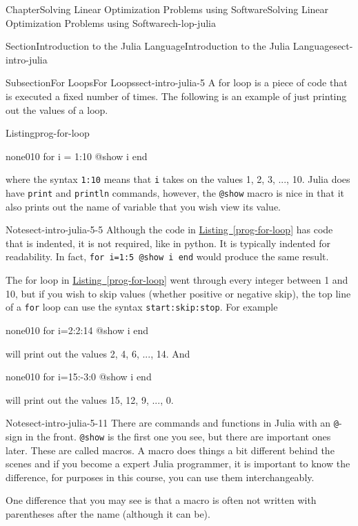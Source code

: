 \documentclass[oneside,10pt,]{book}
\newcommand{\xreffont}{\relax}
\newcommand{\mono}[1]{\texttt{#1}}
\numberwithin{equation}{section}
\begin{document}
\begin{chapterptx}{Chapter}{Solving Linear Optimization Problems using Software}{}{Solving Linear Optimization Problems using Software}{}{}{ch-lop-julia}
\begin{sectionptx}{Section}{Introduction to the Julia Language}{}{Introduction to the Julia Language}{}{}{sect-intro-julia}
\begin{subsectionptx}{Subsection}{For Loops}{}{For Loops}{}{}{sect-intro-julia-5}
A for loop is a piece of code that is executed a fixed number of times. The following is an example of just printing out the values of a loop.%
\begin{listingptx}{Listing}{\textbf{}}{prog-for-loop}{}%
\begin{program}{none}{0}{1}{0}
for i = 1:10
  @show i
end
\end{program}
\end{listingptx}%
where the syntax \mono{1:10} means that \mono{i} takes on the values 1, 2, 3, ..., 10. Julia does have \mono{print} and \mono{println} commands, however, the \mono{@show} macro is nice in that it also prints out the name of variable that you wish view its value.%
\begin{note}{Note}{}{sect-intro-julia-5-5}%
Although the code in \hyperref[prog-for-loop]{Listing~{\xreffont\ref{prog-for-loop}}} has code that is indented, it is not required, like in python. It is typically indented for readability. In fact, \mono{for i=1:5 @show i end} would produce the same result.%
\end{note}
The for loop in \hyperref[prog-for-loop]{Listing~{\xreffont\ref{prog-for-loop}}} went through every integer between 1 and 10, but if you wish to skip values (whether positive or negative skip), the top line of a \mono{for} loop can use the syntax \mono{start:skip:stop}. For example%
\begin{program}{none}{0}{1}{0}
for i=2:2:14
  @show i
end
\end{program}
will print out the values 2, 4, 6, ..., 14. And%
\begin{program}{none}{0}{1}{0}
for i=15:-3:0
  @show i
end
\end{program}
will print out the values 15, 12, 9, ..., 0.%
\begin{note}{Note}{}{sect-intro-julia-5-11}%
There are commands and functions in Julia with an \mono{@}-sign in the front. \mono{@show} is the first one you see, but there are important ones later. These are called macros. A macro does things a bit different behind the scenes and if you become a expert Julia programmer, it is important to know the difference, for purposes in this course, you can use them interchangeably.%
\par
One difference that you may see is that a macro is often not written with  parentheses after the name (although it can be).%
\end{note}
\end{subsectionptx}
%
%
\typeout{************************************************}

\end{sectionptx}
\end{chapterptx}
\end{document}
